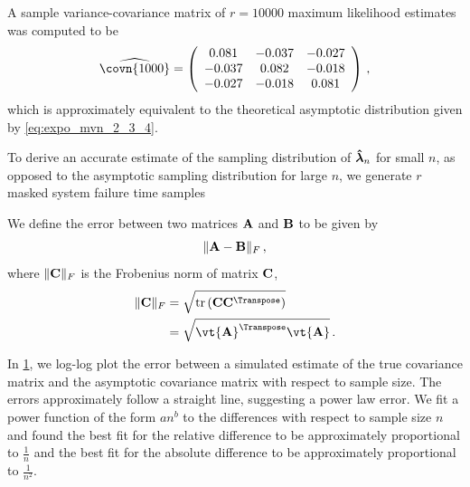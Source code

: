 \documentclass[../main.tex]{subfiles}
\begin{document}
A sample variance-covariance matrix of $r=10000$ maximum likelihood estimates 
was computed to be
\begin{equation}
    \widehat{\covn{1000}} =
    \left(
        \begin{array}{ccc}
            0.081  &   -0.037 &   -0.027\\
            -0.037 &   0.082  &   -0.018\\
            -0.027 &   -0.018 &   0.081
        \end{array}
    \right)\,,
\end{equation}
which is approximately equivalent to the theoretical asymptotic distribution given by \cref{eq:expo_mvn_2_3_4}.

\begin{figure}
\begin{center}

\end{center}
\end{figure}

To derive an accurate estimate of the sampling distribution of $\boldsymbol{\hat{\lambda}}_n$ for small $n$, as opposed to the asymptotic sampling distribution for large $n$, we generate $r$ masked system failure time samples

\begin{figure}
\label{fig:frob_error}
\begin{center}

\end{center}
\end{figure}

We define the error between two matrices $\mathbf{A}$ and $\mathbf{B}$ to be given by
\begin{equation}
    \lVert \mathbf{A} - \mathbf{B} \rVert_F\,,
\end{equation}
where $\lVert \mathbf{C} \rVert_F$ is the Frobenius norm of matrix $\mathbf{C}$,
\begin{align}
    \lVert \matrx{C} \rVert_F
        &= \sqrt{\trace \left( \matrx{C} \matrx{C^\Transpose}\right)}\\
        &= \sqrt{\vt{\matrx{A}}^\Transpose \vt{\matrx{A}}}\,.
\end{align}

In \cref{fig:frob_error}, we log-log plot the error between a simulated estimate of the true covariance matrix and the asymptotic covariance matrix with respect to sample size. The errors approximately follow a straight line, suggesting a power law error. We fit a power function of the form $a n^b$ to the differences with respect to sample size $n$ and found the best fit for the relative difference to be approximately proportional to $\frac{1}{n}$ and the best fit for the absolute difference to be approximately proportional to $\frac{1}{n^2}$.
\end{document}
